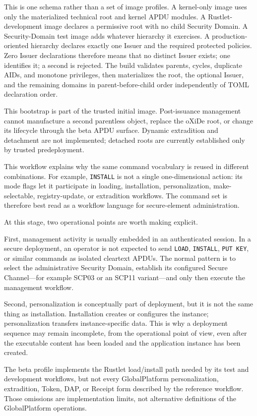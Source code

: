 This is one schema rather than a set of image profiles. A kernel-only image
uses only the materialized technical root and kernel APDU modules. A
Rustlet-development image declares a permissive root with no child Security
Domain. A Security-Domain test image adds whatever hierarchy it exercises. A
production-oriented hierarchy declares exactly one Issuer and the required
protected policies. Zero Issuer declarations therefore means that no distinct
Issuer exists; one identifies it; a second is rejected. The build validates
parents, cycles, duplicate AIDs, and monotone privileges, then materializes the
root, the optional Issuer, and the remaining domains in parent-before-child
order independently of TOML declaration order.

This bootstrap is part of the trusted initial image. Post-issuance management
cannot manufacture a second parentless object, replace the oXiDe root, or
change its lifecycle through the beta APDU surface. Dynamic extradition and
detachment are not implemented; detached roots are currently established only
by trusted predeployment.

This workflow explains why the same command vocabulary is reused in
different combinations. For example, \texttt{INSTALL} is not a single
one-dimensional action: its mode flags let it participate in loading,
installation, personalization, make-selectable, registry-update, or
extradition workflows. The command set is therefore best read as a
workflow language for secure-element administration.

At this stage, two operational points are worth making explicit.

First, management activity is usually embedded in an authenticated
session. In a secure deployment, an operator is not expected to send
\texttt{LOAD}, \texttt{INSTALL}, \texttt{PUT KEY}, or similar commands
as isolated cleartext APDUs. The normal pattern is to select the
administrative Security Domain, establish its configured Secure Channel---for
example SCP03 or an SCP11 variant---and only then execute the management
workflow.

Second, personalization is conceptually part of deployment, but it is not
the same thing as installation. Installation creates or configures the
instance; personalization transfers instance-specific data. This is why a
deployment sequence may remain incomplete, from the operational point of
view, even after the executable content has been loaded and the
application instance has been created.

The beta profile implements the Rustlet load/install path needed by its test
and development workflows, but not every GlobalPlatform personalization,
extradition, Token, DAP, or Receipt form described by the reference workflow.
Those omissions are implementation limits, not alternative definitions of the
GlobalPlatform operations.

